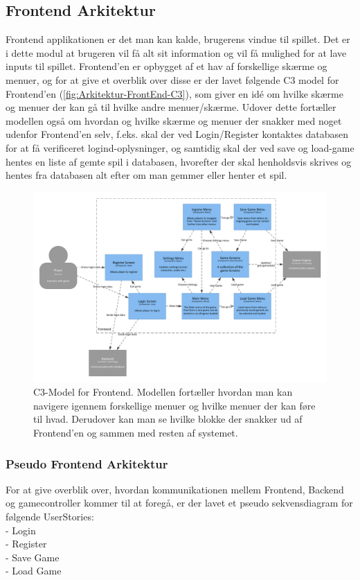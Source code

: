 \subsection{Frontend Arkitektur}

Frontend applikationen er det man kan kalde, brugerens vindue til spillet. Det er i dette modul at brugeren vil få alt sit information
og vil få mulighed for at lave inputs til spillet. 
Frontend'en er opbygget af et hav af forskellige skærme og menuer, og for at give et overblik over disse er der lavet følgende C3 model
for Frontend'en (\autoref{fig:Arkitektur-FrontEnd-C3}), som giver en idé om hvilke skærme og menuer der kan gå til hvilke andre menuer/skærme.
Udover dette fortæller modellen også om hvordan og hvilke skærme og menuer der snakker med noget udenfor Frontend'en selv, f.eks. skal der
ved Login/Register kontaktes databasen for at få verificeret logind-oplysninger, og samtidig skal der ved save og load-game hentes en liste af
gemte spil i databasen, hvorefter der skal henholdsvis skrives og hentes fra databasen alt efter om man gemmer eller henter et spil.

\begin{figure}[H]
\centering
\includegraphics[width = \textwidth]{02-Body/Images/Frontend_C3.pdf}
\caption{C3-Model for Frontend. Modellen fortæller hvordan man kan navigere igennem forskellige menuer og hvilke menuer der kan føre til hvad. Derudover kan man se hvilke blokke der snakker ud af Frontend'en og sammen med resten af systemet.}
\label{fig:Arkitektur-FrontEnd-C3}
\end{figure}

\subsubsection{Pseudo Frontend Arkitektur}
For at give overblik over, hvordan kommunikationen mellem Frontend, Backend og gamecontroller kommer til at foregå, er der lavet et pseudo sekvensdiagram for følgende UserStories:
\\
- Login\\
- Register\\
- Save Game\\
- Load Game\\


